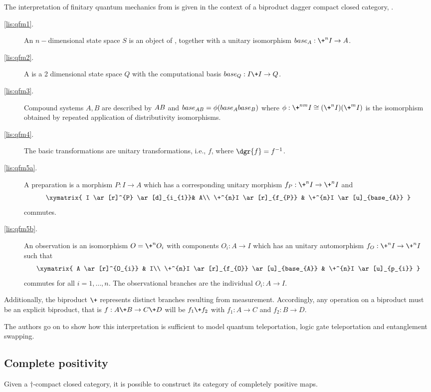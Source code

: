 The interpretation of finitary quantum mechanics from \cite{abramsky04:catsemquantprot} is given in the
context of a biproduct dagger compact closed category, \cD.
\begin{description}
  \item[\ref{lis:qfm1}.] An $n-$dimensional state space $S$ is an object of \cD,
    together with a unitary isomorphism $base_{A}:\+^{n}I\to A$.
  \item[\ref{lis:qfm2}.] A \qubit is a 2 dimensional state space $Q$ with the computational basis
    $base_{Q}:I\+I \to Q$.
  \item[\ref{lis:qfm3}.] Compound systems $A,B$ are described by $A\*B$ and
    $base_{A\*B} = \phi (base_{A}\*base_{B})$ where $\phi:\+^{n m}I \cong(\+^{n}I)\*(\+^{m}I)$ is
    the isomorphism obtained by repeated application of distributivity isomorphisms.
  \item[\ref{lis:qfm4}.] The basic transformations are unitary transformations, i.e., $f$, where
    $\dgr{f} = f^{-1}$.
  \item[\ref{lis:qfm5a}.] A preparation is a morphism $P:I \to A$ which has a corresponding unitary
    morphism $f_{P}:\+^{n}I\to\+^{n}I$ and
    \[
      \xymatrix{
        I \ar[r]^{P} \ar[d]_{i_{1}}& A\\
        \+^{n}I \ar[r]_{f_{P}} & \+^{n}I \ar[u]_{base_{A}}
      }
    \]
    commutes.
  \item[\ref{lis:qfm5b}.] An observation  is an isomorphism $O = \+^{n}O_{i}$ with components
    $O_{i}:A \to I$ which has an unitary automorphism $f_{O}:\+^{n}I\to\+^{n}I$ such that
    \[
      \xymatrix{
        A \ar[r]^{O_{i}} & I\\
        \+^{n}I \ar[r]_{f_{O}}  \ar[u]_{base_{A}} & \+^{n}I \ar[u]_{p_{i}}
      }
    \]
    commutes for all $i=1,\ldots,n$. The observational branches are the individual $O_{i}:A \to I$.
\end{description}
Additionally, the biproduct $\+$ represents distinct branches resulting from measurement.
Accordingly, any operation on a biproduct must be an explicit biproduct, that is $f:A\+B\to C\+D$
will be $f_{1}\+f_{2}$ with $f_{1}:A\to C$ and $f_{2}:B\to D$.

The authors go on to show how this interpretation is sufficient to model quantum teleportation,
logic gate teleportation and entanglement swapping.


\subsection{Complete positivity}\label{sec:completepositivity}
Given a $\dagger$-compact closed category, it is possible to construct its category of completely
positive maps.

